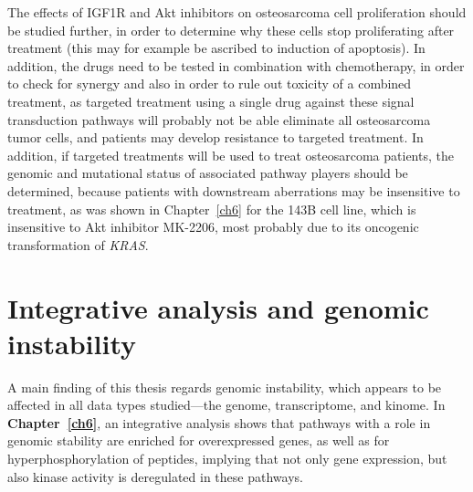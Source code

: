 The effects of IGF1R and Akt inhibitors on osteosarcoma cell proliferation should be studied further, in order to determine why these cells stop proliferating after treatment (this may for example be ascribed to induction of apoptosis). In addition, the drugs need to be tested in combination with chemotherapy, in order to check for synergy and also in order to rule out toxicity of a combined treatment, as targeted treatment using a single drug against these signal transduction pathways will probably not be able eliminate all osteosarcoma tumor cells, and patients may develop resistance to targeted treatment. In addition, if targeted treatments will be used to treat osteosarcoma patients, the genomic and mutational status of associated pathway players should be determined, because patients with downstream aberrations may be insensitive to treatment, as was shown in Chapter~\ref{ch6} for the 143B cell line, which is insensitive to Akt inhibitor MK-2206, most probably due to its oncogenic transformation of {\it KRAS}.

%
\section{Integrative analysis and genomic instability}\label{integrative9}
A main finding of this thesis regards genomic instability, which appears to be affected in all data types studied---the genome, transcriptome, and kinome. In {\bf Chapter~\ref{ch6}}, an integrative analysis shows that pathways with a role in genomic stability are enriched for overexpressed genes, as well as for hyperphosphorylation of peptides, implying that not only gene expression, but also kinase activity is deregulated in these pathways.

